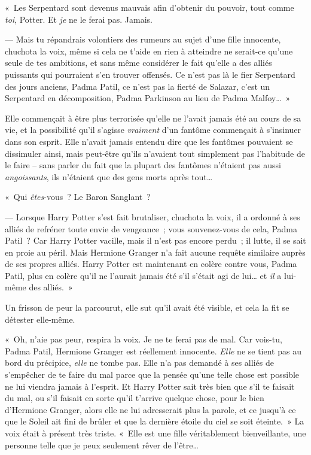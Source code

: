 «~Les Serpentard sont devenus mauvais afin d'obtenir du pouvoir, tout comme \emph{toi}, Potter. Et \emph{je} ne le ferai pas. Jamais.

--- Mais tu répandrais volontiers des rumeurs au sujet d'une fille innocente, chuchota la voix, même si cela ne t'aide en rien à atteindre ne serait-ce qu'une seule de tes ambitions, et sans même considérer le fait qu'elle a des alliés puissants qui pourraient s'en trouver offensés. Ce n'est pas là le fier Serpentard des jours anciens, Padma Patil, ce n'est pas la fierté de Salazar, c'est un Serpentard en décomposition, Padma Parkinson au lieu de Padma Malfoy…~»

Elle commençait à être plus terrorisée qu'elle ne l'avait jamais été au cours de sa vie, et la possibilité qu'il s'agisse \emph{vraiment} d'un fantôme commençait à s'insinuer dans son esprit. Elle n'avait jamais entendu dire que les fantômes pouvaient se dissimuler ainsi, mais peut-être qu'ils n'avaient tout simplement pas l'habitude de le faire -- sans parler du fait que la plupart des fantômes n'étaient pas aussi \emph{angoissants}, ils n'étaient que des gens morts après tout…

«~Qui \emph{êtes}-vous~? Le Baron Sanglant~?

--- Lorsque Harry Potter s'est fait brutaliser, chuchota la voix, il a ordonné à ses alliés de refréner toute envie de vengeance~; vous souvenez-vous de cela, Padma Patil~? Car Harry Potter vacille, mais il n'est pas encore perdu~; il lutte, il se sait en proie au péril. Mais Hermione Granger n'a fait aucune requête similaire auprès de ses propres alliés. Harry Potter est maintenant en colère contre vous, Padma Patil, plus en colère qu'il ne l'aurait jamais été s'il s'était agi de lui… et \emph{il} a lui-même des alliés.~»

Un frisson de peur la parcourut, elle sut qu'il avait été visible, et cela la fit se détester elle-même.

«~Oh, n'aie pas peur, respira la voix. Je ne te ferai pas de mal. Car vois-tu, Padma Patil, Hermione Granger est réellement innocente. \emph{Elle} ne se tient pas au bord du précipice, \emph{elle} ne tombe pas. Elle n'a pas demandé à ses alliés de s'empêcher de te faire du mal parce que la pensée qu'une telle chose est possible ne lui viendra jamais à l'esprit. Et Harry Potter sait très bien que s'il te faisait du mal, ou s'il faisait en sorte qu'il t'arrive quelque chose, pour le bien d'Hermione Granger, alors elle ne lui adresserait plus la parole, et ce jusqu'à ce que le Soleil ait fini de brûler et que la dernière étoile du ciel se soit éteinte.~» La voix était à présent très triste. «~Elle est une fille véritablement bienveillante, une personne telle que je peux seulement rêver de l'être…

